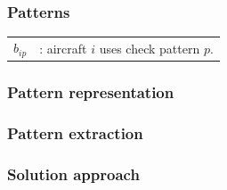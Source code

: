 \section{\thirdtitle}

\begin{frame}
\frametitle{\textbf{Patterns}}
  \begin{tabular}{p{5mm}p{90mm}}
    $b_{ip}$ &: aircraft $i$ uses check pattern $p$. \\
  \end{tabular}


\end{frame}

\begin{frame}
\frametitle{\textbf{Pattern representation}}
  \begin{adjustbox}{max totalsize={\textwidth}{\textheight},left, trim=15pt 0 0 0}
    
  \end{adjustbox}


\end{frame}

\begin{frame}
\frametitle{\textbf{Pattern extraction}}

\end{frame}

\begin{frame}
\frametitle{\textbf{Solution approach}}
\begin{adjustbox}{max totalsize={0.8\textwidth}{0.8\textheight},center}
  
\end{adjustbox}

\end{frame}

